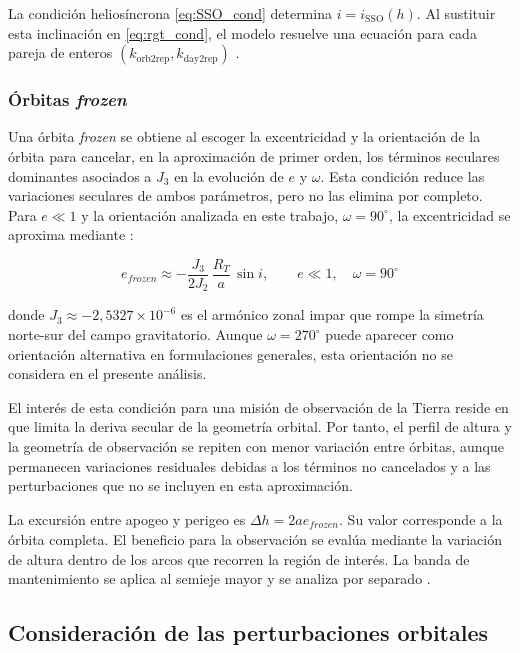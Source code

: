 La condición heliosíncrona \eqref{eq:SSO_cond} determina
$i=i_{\mathrm{SSO}}(h)$. Al sustituir esta inclinación en
\eqref{eq:rgt_cond}, el modelo resuelve una ecuación para cada pareja de
enteros $(k_{\mathrm{orb2rep}},k_{\mathrm{day2rep}})$
\cite{vallado2013fundamentals}.

\subsubsection{Órbitas \textit{frozen}}

Una órbita \textit{frozen} se obtiene al escoger la excentricidad y la
orientación de la órbita para cancelar, en la aproximación de primer orden,
los términos seculares dominantes asociados a $J_3$ en la evolución de $e$ y
$\omega$. Esta condición reduce las variaciones seculares de ambos
parámetros, pero no las elimina por completo. Para $e\ll1$ y la orientación
analizada en este trabajo, $\omega=90^\circ$, la excentricidad se aproxima
mediante \cite{vallado2013fundamentals}:

\begin{equation}
e_{\textit{frozen}} \approx -\frac{J_3}{2J_2}\,\frac{R_T}{a}\,\sin i,
\qquad e\ll1,\quad \omega=90^\circ
\label{eq:frozen_cond}
\end{equation}

donde $J_3 \approx -2{,}5327 \times 10^{-6}$ es el armónico zonal impar que
rompe la simetría norte-sur del campo gravitatorio. Aunque $\omega=270^\circ$
puede aparecer como orientación alternativa en formulaciones generales, esta
orientación no se considera en el presente análisis.

El interés de esta condición para una misión de observación de la Tierra
reside en que limita la deriva secular de la geometría orbital. Por tanto,
el perfil de altura y la geometría de observación se repiten con menor
variación entre órbitas, aunque permanecen variaciones residuales debidas a
los términos no cancelados y a las perturbaciones que no se incluyen en esta
aproximación.

La excursión entre apogeo y perigeo es $\Delta h=2ae_{\textit{frozen}}$. Su valor corresponde a la órbita completa. El beneficio para la observación se evalúa mediante la variación de altura dentro de los arcos que recorren la región de interés. La banda de mantenimiento se aplica al semieje mayor y se analiza por separado \cite{vallado2013fundamentals}.

\subsection{Consideración de las perturbaciones orbitales}


